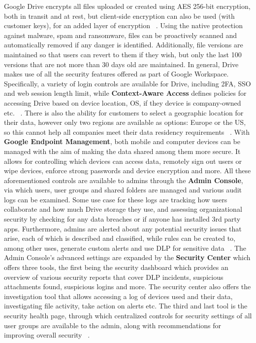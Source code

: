Google Drive encrypts all files uploaded or created using AES 256-bit encryption, both in transit and at rest, but client-side encryption can also be used (with customer keys), for an added layer of encryption ~\cite{drive_encryption,drive_client-side}. Using the native protection against malware, spam and ransomware, files can be proactively scanned and  automatically removed if any danger is identified. Additionally, file versions are maintained so that users can revert to them if they wish, but only the last 100 versions that are not more than 30 days old are maintained.  In general, Drive makes use of all the security features offered as part of Google Workspace. Specifically, a variety of login controls are available for Drive, including 2FA, SSO and web session length limit, while \textbf{Context-Aware Access} defines policies for accessing Drive based on device location, OS, if they device is company-owned etc. ~\cite{drive_login_security,drive_context-aware}. There is also the ability for customers to select a geographic location for their data, however only two regions are available as options: Europe or the US, so this cannot help all companies meet their data residency requirements ~\cite{drive_regions}. With \textbf{Google Endpoint Management}, both mobile and computer devices can be managed with the aim of making the data shared among them more secure. It allows for controlling which devices can access data, remotely sign out users or wipe devices, enforce strong passwords and device encryption and more. All these aforementioned controls are available to admins  through the \textbf{Admin Console}, via which users, user groups and shared folders are managed and various audit logs can be examined. Some use case for these logs are tracking how users collaborate and how much Drive storage they use, and assessing organizational security by checking for any data breaches or if anyone has installed 3rd party apps. Furthermore, admins are alerted about any potential security issues that arise, each of which is described and classified, while rules can be created to, among other uses, generate custom alerts and use DLP for sensitive data ~\cite{drive_admin,drive_rules}. The Admin Console's advanced settings are expanded by the \textbf{Security Center} which offers three tools, the first being the security dashboard which provides an overview of various security reports that cover DLP incidents, suspicious attachments found, suspicious logins and more. The security center also offers the  investigation tool that allows accessing a log of devices used and their data, investigating file activity, take action on alerts etc. The third and last tool is the security health page, through which centralized controls for security settings of all user groups are available to the admin, along with recommendations for improving overall security ~\cite{google_drive,drive_security_center}.

